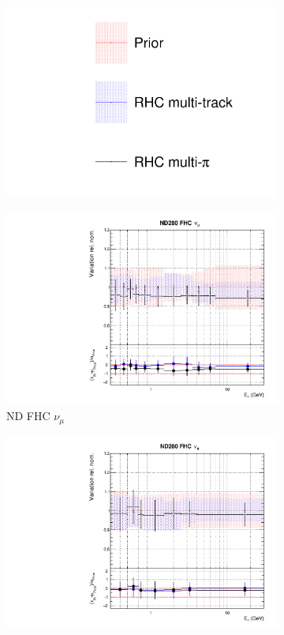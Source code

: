 \begin{figure}[t]
\centering
\begin{subfigure}{0.95\textwidth}
  \centering
  \includegraphics[width=0.24\linewidth]{figs/rhcmpasmv_leg}
  \caption{}
  \label{fig:}
\end{subfigure}
\begin{subfigure}{0.24\textwidth}
  \centering
  \includegraphics[width=0.95\linewidth]{figs/rhcmpasmvflux0}
  \caption{ND FHC $\nu_{\mu}$}
  \label{fig:}
\end{subfigure}
\begin{subfigure}{0.24\textwidth}
  \centering
  \includegraphics[width=0.95\linewidth]{figs/rhcmpasmvflux1}

\end{subfigure}
\end{figure}
